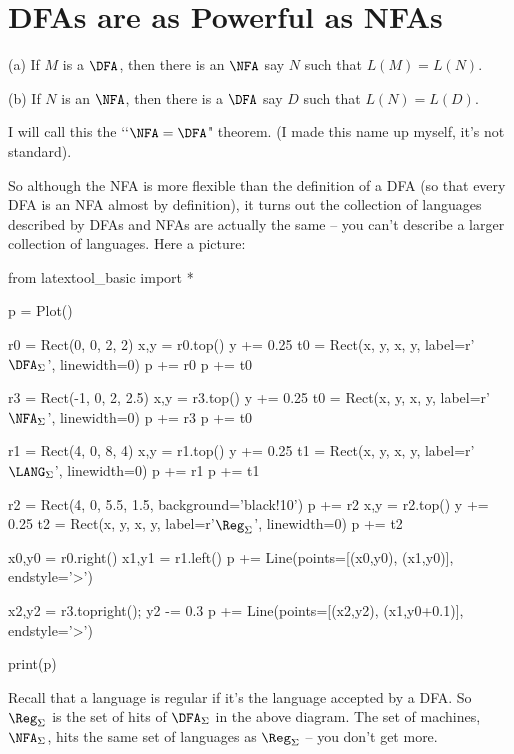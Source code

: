 \section{DFAs are as Powerful as NFAs}

\begin{thm} \mbox{}
 \begin{tightlist}
 \item[(a)] If $M$ is a $\DFA$, then there is an $\NFA$ say $N$ such
  that $L(M) = L(N)$.
 \item[(b)] If $N$ is an $\NFA$, then there is a $\DFA$ say $D$ such
 that $L(N) = L(D)$.
 \end{tightlist}
\end{thm}

I will call this the \lq\lq $\NFA = \DFA$" theorem. (I made this name up
myself, it's not standard).

So although the NFA is more flexible than the definition of a DFA
(so that every DFA is an NFA almost by definition),
it turns out the collection of languages described by DFAs and NFAs
are actually the same -- you can't describe a larger collection of languages.
Here a picture:

\begin{python}
from latextool_basic import *

p = Plot()

r0 = Rect(0, 0, 2, 2)
x,y = r0.top()
y += 0.25
t0 = Rect(x, y, x, y, label=r'$\DFA_\Sigma$', linewidth=0)
p += r0
p += t0

r3 = Rect(-1, 0, 2, 2.5)
x,y = r3.top()
y += 0.25
t0 = Rect(x, y, x, y, label=r'$\NFA_\Sigma$', linewidth=0)
p += r3
p += t0

r1 = Rect(4, 0, 8, 4)
x,y = r1.top()
y += 0.25
t1 = Rect(x, y, x, y, label=r'$\LANG_\Sigma$', linewidth=0)
p += r1
p += t1

r2 = Rect(4, 0, 5.5, 1.5, background='black!10')
p += r2
x,y = r2.top()
y += 0.25
t2 = Rect(x, y, x, y, label=r'$\Reg_\Sigma$', linewidth=0)
p += t2

x0,y0 = r0.right()
x1,y1 = r1.left()
p += Line(points=[(x0,y0), (x1,y0)], endstyle='>')

x2,y2 = r3.topright(); y2 -= 0.3
p += Line(points=[(x2,y2), (x1,y0+0.1)], endstyle='>')

print(p)
\end{python}

Recall that a language is regular if it's the language
accepted by a DFA.
So $\Reg_\Sigma$ is the set of hits of $\DFA_\Sigma$ in the above diagram.
The set of machines, $\NFA_\Sigma$, hits
the same set of languages as $\Reg_\Sigma$ -- you don't get more.

